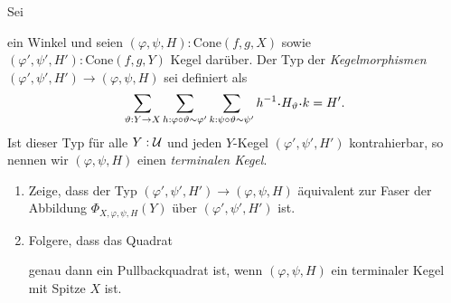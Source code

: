\documentclass{uebung}
\begin{document}
\begin{bonus}
  Sei
  ein Winkel und seien $(\varphi,\psi,H):\mathrm{Cone}(f,g,X)$ sowie $(\varphi',\psi',H'):\mathrm{Cone}(f,g,Y)$ Kegel darüber.
  Der Typ der \emph{Kegelmorphismen} $(\varphi',\psi',H')\to (\varphi,\psi,H)$ sei definiert als
  $$
  \sum_{\vartheta:Y \to X}
  \sum_{h:\varphi\circ\vartheta\sim\varphi'}
  \sum_{k:\psi\circ\vartheta\sim\psi'}
  h^{-1} \kon H_\vartheta \kon k = H'.
  $$
  Ist dieser Typ für alle $Y:\mathcal{U}$ und jeden $Y$-Kegel $(\varphi',\psi',H')$ kontrahierbar, so nennen wir $(\varphi,\psi,H)$ einen \emph{terminalen Kegel}.
  \begin{enumerate}
    \item Zeige, dass der Typ $(\varphi',\psi',H')\to (\varphi,\psi,H)$ äquivalent zur Faser der Abbildung $\Phi_{X,\varphi,\psi,H}(Y)$ über $(\varphi',\psi',H')$ ist.
    \item Folgere, dass das Quadrat
      \begin{center}
      \end{center}
      genau dann ein Pullbackquadrat ist, wenn $(\varphi,\psi,H)$ ein terminaler Kegel mit Spitze $X$ ist.
  \end{enumerate}
\end{bonus}
\end{document}
